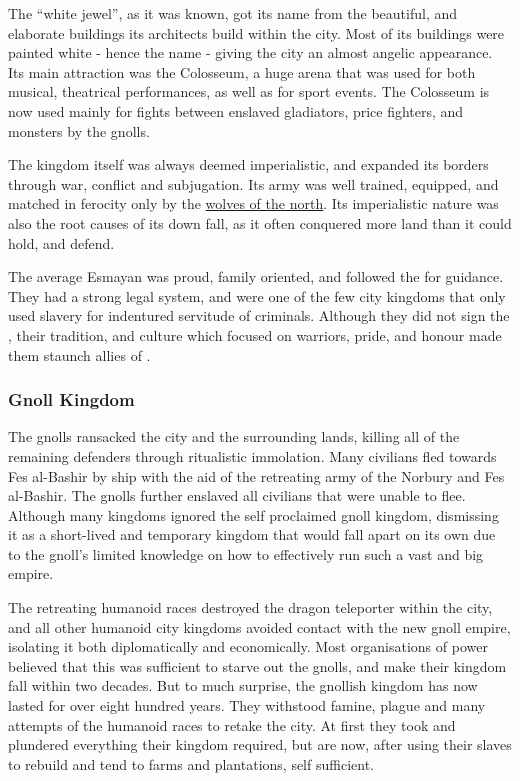 The ``white jewel'', as it was known, got its name from the beautiful, and
elaborate buildings its architects build within the city. Most of its
buildings were painted white - hence the name - giving the city an almost
angelic appearance. Its main attraction was the Colosseum, a huge arena
that was used for both musical, theatrical performances, as well as for
sport events. The Colosseum is now used mainly for fights between enslaved
gladiators, price fighters, and monsters by the gnolls.

The kingdom itself was always deemed imperialistic, and expanded its borders
through war, conflict and subjugation. Its army was well trained, equipped,
and matched in ferocity only by the \hyperref[sec:Norbury]{wolves of the
  north}. Its imperialistic nature was also the root causes of its down fall,
as it often conquered more land than it could hold, and defend.

The average Esmayan was proud, family oriented, and followed the
 for guidance. They had a strong legal system, and were one
of the few city kingdoms that only used slavery for indentured servitude of
criminals. Although they did not sign the , their
tradition, and culture which focused on warriors, pride, and honour made them
staunch allies of .

\subsubsection{Gnoll Kingdom}

The gnolls ransacked the city and the surrounding lands, killing all of the
remaining defenders through ritualistic immolation. Many civilians fled
towards Fes al-Bashir by ship with the aid of the retreating army of the
Norbury and Fes al-Bashir. The gnolls further enslaved all civilians that were
unable to flee. Although many kingdoms ignored the self proclaimed gnoll
kingdom, dismissing it as a short-lived and temporary kingdom that would fall
apart on its own due to the gnoll's limited knowledge on how to effectively
run such a vast and big empire.

The retreating humanoid races destroyed the dragon teleporter within the city,
and all other humanoid city kingdoms avoided contact with the new gnoll
empire, isolating it both diplomatically and economically. Most organisations
of power believed that this was sufficient to starve out the gnolls, and make
their kingdom fall within two decades. But to much surprise, the gnollish
kingdom has now lasted for over eight hundred years. They withstood famine,
plague and many attempts of the humanoid races to retake the city. At first
they took and plundered everything their kingdom required, but are now, after
using their slaves to rebuild and tend to farms and plantations, self
sufficient.

